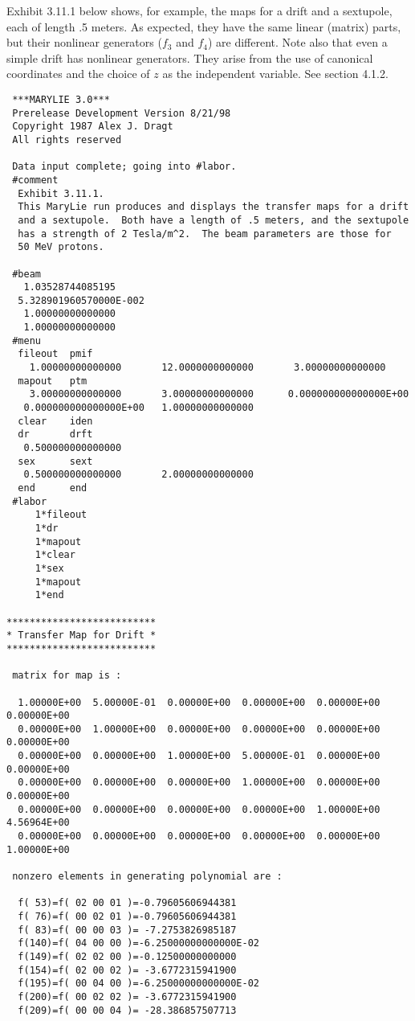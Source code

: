 Exhibit 3.11.1 below shows, for example, the maps for a drift and a sextupole,
each of length .5 meters.  As expected, they have the same linear
(matrix) parts, but their nonlinear generators ($f_3$ and $f_4$) are
different.  Note also that even a simple drift has nonlinear generators.
They arise from the use of canonical coordinates and the choice of $z$ as
the independent variable.  See section 4.1.2.

\begin{footnotesize}
\begin{verbatim}
 ***MARYLIE 3.0***
 Prerelease Development Version 8/21/98
 Copyright 1987 Alex J. Dragt
 All rights reserved

 Data input complete; going into #labor.
 #comment
  Exhibit 3.11.1.
  This MaryLie run produces and displays the transfer maps for a drift
  and a sextupole.  Both have a length of .5 meters, and the sextupole
  has a strength of 2 Tesla/m^2.  The beam parameters are those for
  50 MeV protons.

 #beam
   1.03528744085195
  5.328901960570000E-002
   1.00000000000000
   1.00000000000000
 #menu
  fileout  pmif
    1.00000000000000       12.0000000000000       3.00000000000000
  mapout   ptm
    3.00000000000000       3.00000000000000      0.000000000000000E+00
   0.000000000000000E+00   1.00000000000000
  clear    iden
  dr       drft
   0.500000000000000
  sex      sext
   0.500000000000000       2.00000000000000
  end      end
 #labor
     1*fileout
     1*dr
     1*mapout
     1*clear
     1*sex
     1*mapout
     1*end

**************************
* Transfer Map for Drift *
**************************

 matrix for map is :

  1.00000E+00  5.00000E-01  0.00000E+00  0.00000E+00  0.00000E+00  0.00000E+00
  0.00000E+00  1.00000E+00  0.00000E+00  0.00000E+00  0.00000E+00  0.00000E+00
  0.00000E+00  0.00000E+00  1.00000E+00  5.00000E-01  0.00000E+00  0.00000E+00
  0.00000E+00  0.00000E+00  0.00000E+00  1.00000E+00  0.00000E+00  0.00000E+00
  0.00000E+00  0.00000E+00  0.00000E+00  0.00000E+00  1.00000E+00  4.56964E+00
  0.00000E+00  0.00000E+00  0.00000E+00  0.00000E+00  0.00000E+00  1.00000E+00

 nonzero elements in generating polynomial are :

  f( 53)=f( 02 00 01 )=-0.79605606944381
  f( 76)=f( 00 02 01 )=-0.79605606944381
  f( 83)=f( 00 00 03 )= -7.2753826985187
  f(140)=f( 04 00 00 )=-6.25000000000000E-02
  f(149)=f( 02 02 00 )=-0.12500000000000
  f(154)=f( 02 00 02 )= -3.6772315941900
  f(195)=f( 00 04 00 )=-6.25000000000000E-02
  f(200)=f( 00 02 02 )= -3.6772315941900
  f(209)=f( 00 00 04 )= -28.386857507713


\end{verbatim}
\end{footnotesize}
